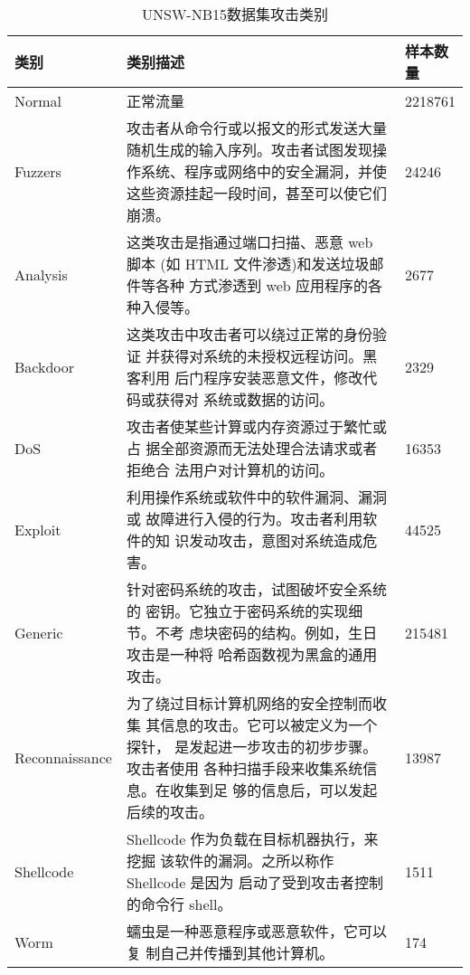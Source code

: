 \begin{table}[H]
    \begin{tabular}{p{0.18\linewidth}<{\raggedright} | p{0.7\linewidth}<{\raggedright}| p{0.12\linewidth}<{\raggedright}}
    \toprule 
    类别 & 类别描述                                                                       & 样本数量    \\ \midrule 
    Normal  & 正常流量                                                                       & 2218761 \\ \hline
    Fuzzers & 攻击者从命令行或以报文的形式发送大量随机生成的输入序列。攻击者试图发现操作系统、程序或网络中的安全漏洞，并使这些资源挂起一段时间，甚至可以使它们崩溃。 & 24246   \\ \hline
    Analysis & 这类攻击是指通过端口扫描、恶意 web 脚本
(如 HTML 文件渗透)和发送垃圾邮件等各种
方式渗透到 web 应用程序的各种入侵等。 & 2677 \\ \hline
Backdoor & 这类攻击中攻击者可以绕过正常的身份验证
并获得对系统的未授权远程访问。黑客利用
后门程序安装恶意文件，修改代码或获得对
系统或数据的访问。 &
2329 \\ \hline
DoS & 攻击者使某些计算或内存资源过于繁忙或占
据全部资源而无法处理合法请求或者拒绝合
法用户对计算机的访问。 &
16353 \\ \hline
Exploit & 利用操作系统或软件中的软件漏洞、漏洞或
故障进行入侵的行为。攻击者利用软件的知
识发动攻击，意图对系统造成危害。 &
44525 \\ \hline
Generic & 针对密码系统的攻击，试图破坏安全系统的
密钥。它独立于密码系统的实现细节。不考
虑块密码的结构。例如，生日攻击是一种将
哈希函数视为黑盒的通用攻击。 &
215481 \\ \hline
Reconnaissance & 为了绕过目标计算机网络的安全控制而收集
其信息的攻击。它可以被定义为一个探针，
是发起进一步攻击的初步步骤。攻击者使用
各种扫描手段来收集系统信息。在收集到足
够的信息后，可以发起后续的攻击。 &
13987 \\ \hline
Shellcode & Shellcode 作为负载在目标机器执行，来挖掘
该软件的漏洞。之所以称作 Shellcode 是因为
启动了受到攻击者控制的命令行 shell。 &
1511 \\ \hline
Worm & 蠕虫是一种恶意程序或恶意软件，它可以复
制自己并传播到其他计算机。 &
174 \\  
\bottomrule
\end{tabular}
\caption{UNSW-NB15数据集攻击类别}
\label{label:UNSW-NB15}
\end{table}

